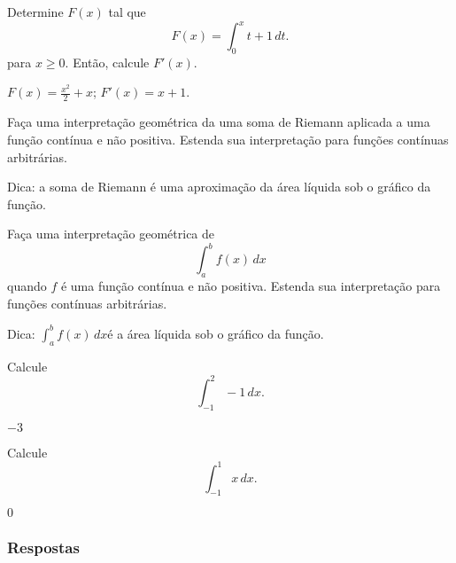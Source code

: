 \begin{exer}
  Determine $F(x)$ tal que
  \begin{equation}
    F(x) = \int_{0}^{x} t+1\,dt.
  \end{equation}
  para $x\geq 0$. Então, calcule $F'(x)$.
\end{exer}
\begin{resp}
  $\displaystyle F(x) = \frac{x^2}{2} + x$; $F'(x) = x + 1$.
\end{resp}

\begin{exer}\label{exer:int_geoRiemann}
  Faça uma interpretação geométrica da uma soma de Riemann aplicada a uma função contínua e não positiva. Estenda sua interpretação para funções contínuas arbitrárias.
\end{exer}
\begin{resp}
  Dica: a soma de Riemann é uma aproximação da área líquida sob o gráfico da função.
\end{resp}

\begin{exer}\label{exer:int_geointdef}
  Faça uma interpretação geométrica de
  \begin{equation}
    \int_a^b f(x)\,dx
  \end{equation}
  quando $f$ é uma função contínua e não positiva. Estenda sua interpretação para funções contínuas arbitrárias.
\end{exer}
\begin{resp}
  Dica: $\displaystyle \int_a^b f(x)\,dx$é a área líquida sob o gráfico da função.
\end{resp}

\begin{exer}
  Calcule
  \begin{equation}
    \int_{-1}^2 -1\,dx.
  \end{equation}
\end{exer}
\begin{resp}
  $-3$
\end{resp}

\begin{exer}
  Calcule
  \begin{equation}
    \int_{-1}^{1} x\,dx.
  \end{equation}
\end{exer}
\begin{resp}
  $0$
\end{resp}

\ifisbook
\subsubsection{Respostas}
\shipoutAnswer
\fi


